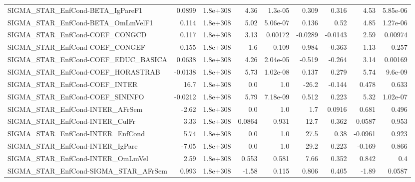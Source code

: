 \begin{tabular}{lrrrrrrrr}
SIGMA\_STAR\_EnfCond-BETA\_IgPareF1      &      0.0899 &     1.8e+308 &     4.36 &  1.3e-05 &      0.309 &       0.316 &         4.53 &      5.85e-06 \\
SIGMA\_STAR\_EnfCond-BETA\_OmLmVelF1     &       0.114 &     1.8e+308 &     5.02 & 5.06e-07 &      0.136 &        0.52 &         4.85 &      1.27e-06 \\
SIGMA\_STAR\_EnfCond-COEF\_CONGCD        &       0.117 &     1.8e+308 &     3.13 &  0.00172 &    -0.0289 &     -0.0143 &         2.59 &       0.00974 \\
SIGMA\_STAR\_EnfCond-COEF\_CONGEF        &       0.155 &     1.8e+308 &      1.6 &    0.109 &     -0.984 &      -0.363 &         1.13 &         0.257 \\
SIGMA\_STAR\_EnfCond-COEF\_EDUC\_BASICA   &      0.0638 &     1.8e+308 &     4.26 & 2.04e-05 &     -0.519 &      -0.264 &         3.14 &       0.00169 \\
SIGMA\_STAR\_EnfCond-COEF\_HORASTRAB     &     -0.0138 &     1.8e+308 &     5.73 & 1.02e-08 &      0.137 &       0.279 &         5.74 &       9.6e-09 \\
SIGMA\_STAR\_EnfCond-COEF\_INTER         &        16.7 &     1.8e+308 &      0.0 &      1.0 &      -26.2 &      -0.144 &        0.478 &         0.633 \\
SIGMA\_STAR\_EnfCond-COEF\_SININFO       &     -0.0212 &     1.8e+308 &     5.79 & 7.18e-09 &      0.512 &       0.223 &         5.32 &      1.02e-07 \\
SIGMA\_STAR\_EnfCond-INTER\_AFrSem       &       -2.62 &     1.8e+308 &      0.0 &      1.0 &        1.7 &      0.0916 &        0.681 &         0.496 \\
SIGMA\_STAR\_EnfCond-INTER\_CulFr        &        3.33 &     1.8e+308 &   0.0864 &    0.931 &       12.7 &       0.362 &       0.0587 &         0.953 \\
SIGMA\_STAR\_EnfCond-INTER\_EnfCond      &        5.74 &     1.8e+308 &      0.0 &      1.0 &       27.5 &        0.38 &      -0.0961 &         0.923 \\
SIGMA\_STAR\_EnfCond-INTER\_IgPare       &       -7.05 &     1.8e+308 &      0.0 &      1.0 &       29.2 &       0.223 &       -0.169 &         0.866 \\
SIGMA\_STAR\_EnfCond-INTER\_OmLmVel      &        2.59 &     1.8e+308 &    0.553 &    0.581 &       7.66 &       0.352 &        0.842 &           0.4 \\
SIGMA\_STAR\_EnfCond-SIGMA\_STAR\_AFrSem  &       0.993 &     1.8e+308 &    -1.58 &    0.115 &      0.806 &       0.405 &        -1.89 &        0.0587 \\

\end{tabular}

